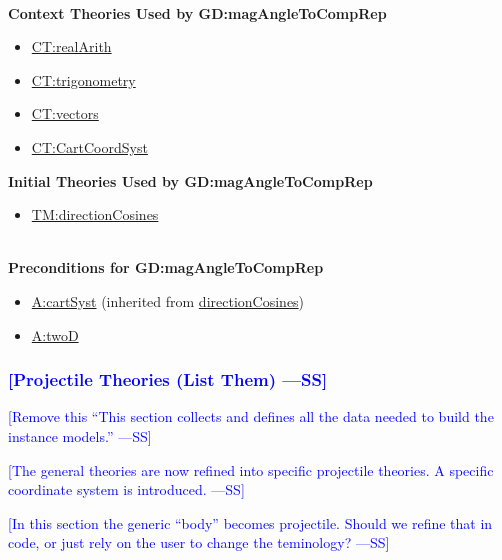 \documentclass[12pt]{article}
\newcommand{\authornote}[3]{\textcolor{#1}{[#3 ---#2]}}
\newcommand{\authornote}[3]{}
\newcommand{\wss}[1]{\authornote{blue}{SS}{#1}}
\begin{document}
~\\
\noindent \textbf{Context Theories Used by GD:magAngleToCompRep}

\begin{itemize}
\item \hyperref[CT:realArith]{CT:realArith}
\item \hyperref[CT:trigonometry]{CT:trigonometry}
\item \hyperref[CT:vectors]{CT:vectors}
\item \hyperref[CT:CartCoordSyst]{CT:CartCoordSyst}
\end{itemize}

\noindent \textbf{Initial Theories Used by GD:magAngleToCompRep}

\begin{itemize}
\item \hyperref[TM:directionCosines]{TM:directionCosines}
\end{itemize}

~\\
\noindent \textbf{Preconditions for GD:magAngleToCompRep}

\begin{itemize}
\item \hyperref[cartSyst]{A:cartSyst} (inherited from \hyperref[directionCosines]{directionCosines})
\item \hyperref[twoD]{A:twoD}
\end{itemize}

\subsubsection{\wss{Projectile Theories (List Them)}}
\label{Sec:DDs}
\wss{Remove this ``This section collects and defines all the data needed to
build the instance models.''}

\wss{The general theories are now refined into specific projectile theories.
A specific coordinate system is introduced.}

\wss{In this section the generic ``body'' becomes projectile.  Should we refine
that in code, or just rely on the user to change the teminology?}
\end{document}
